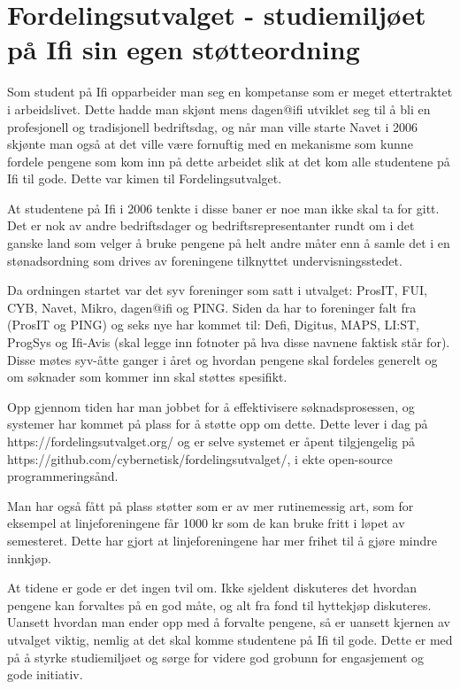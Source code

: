 \chapter[Fordelingsutvalget]{Fordelingsutvalget - studiemiljøet på Ifi sin egen støtteordning}

\author{Skrevet av Arne Hassel og Nikolas Papaioannou}

Som student på Ifi opparbeider man seg en kompetanse som er meget ettertraktet i arbeidslivet. Dette hadde man skjønt mens dagen@ifi utviklet seg til å bli en profesjonell og tradisjonell bedriftsdag, og når man ville starte Navet i 2006 skjønte man også at det ville være fornuftig med en mekanisme som kunne fordele pengene som kom inn på dette arbeidet slik at det kom alle studentene på Ifi til gode. Dette var kimen til Fordelingsutvalget.

At studentene på Ifi i 2006 tenkte i disse baner er noe man ikke skal ta for gitt. Det er nok av andre bedriftsdager og bedriftsrepresentanter rundt om i det ganske land som velger å bruke pengene på helt andre måter enn å samle det i en stønadsordning som drives av foreningene tilknyttet undervisningsstedet.

Da ordningen startet var det syv foreninger som satt i utvalget: ProsIT, FUI, CYB, Navet, Mikro, dagen@ifi og PING. Siden da har to foreninger falt fra (ProsIT og PING) og seks nye har kommet til: Defi, Digitus, MAPS, LI:ST, ProgSys og Ifi-Avis (skal legge inn fotnoter på hva disse navnene faktisk står for). Disse møtes syv-åtte ganger i året og hvordan pengene skal fordeles generelt og om søknader som kommer inn skal støttes spesifikt.

Opp gjennom tiden har man jobbet for å effektivisere søknadsprosessen, og systemer har kommet på plass for å støtte opp om dette. Dette lever i dag på https://fordelingsutvalget.org/ og er selve systemet er åpent tilgjengelig på https://github.com/cybernetisk/fordelingsutvalget/, i ekte open-source programmeringsånd.

Man har også fått på plass støtter som er av mer rutinemessig art, som for eksempel at linjeforeningene får 1000 kr som de kan bruke fritt i løpet av semesteret. Dette har gjort at linjeforeningene har mer frihet til å gjøre mindre innkjøp.

At tidene er gode er det ingen tvil om. Ikke sjeldent diskuteres det hvordan pengene kan forvaltes på en god måte, og alt fra fond til hyttekjøp diskuteres. Uansett hvordan man ender opp med å forvalte pengene, så er uansett kjernen av utvalget viktig, nemlig at det skal komme studentene på Ifi til gode. Dette er med på å styrke studiemiljøet og sørge for videre god grobunn for engasjement og gode initiativ.
